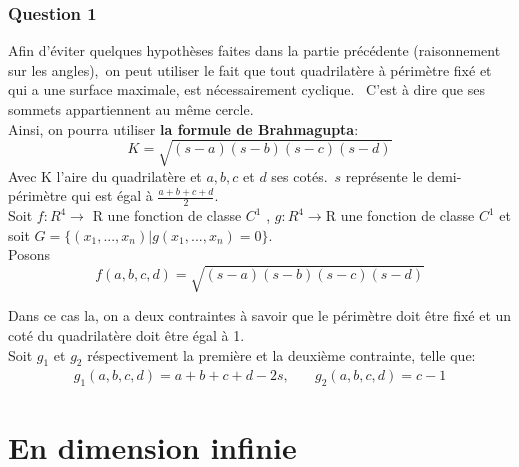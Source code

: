 \documentclass[12pt]{report}
\begin{document}
\section{Question 1}
Afin d'éviter quelques hypothèses faites dans la partie précédente (raisonnement sur les angles),\ on peut utiliser le fait que tout quadrilatère à périmètre fixé et qui a une surface maximale, est nécessairement cyclique. \ C'est à dire que ses sommets appartiennent au même cercle.\\
Ainsi, on pourra utiliser \textbf{la formule de Brahmagupta}:
\begin{equation}
   K={\sqrt{(s-a)(s-b)(s-c)(s-d)}} 
\end{equation}
Avec K l'aire du quadrilatère et $a,b,c$ et $d$ ses cotés.\ $s$ représente le demi-périmètre qui est égal à $\frac{a+b+c+d}{2}$.\\
\indent Soit $f:R^{4}\longrightarrow$ R une fonction de classe $C^{1}$ , $g:R^{4}\longrightarrow$R une fonction de classe
$C^{1}$ et soit $ G = \lbrace (x_{1},...,x_{n})\vert g(x_{1},...,x_{n})=0\rbrace.$\\
\indent Posons 
\begin{equation}
    f(a,b,c,d)={\sqrt{(s-a)(s-b)(s-c)(s-d)}} 
\end{equation}

Dans ce cas la, on a deux contraintes à savoir que le périmètre doit être fixé et un coté du quadrilatère doit être égal à 1.\\
\indent Soit $g_{1}$ et $g_{2}$ réspectivement la première et la deuxième contrainte, telle que:
\begin{align*}
     g_{1}(a,b,c,d)=a+b+c+d-2s,\quad  & g_{2}(a,b,c,d)=c-1
\end{align*}
\part{En dimension infinie}
\end{document}
